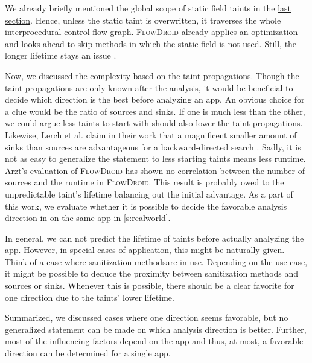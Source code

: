 \documentclass[../draft.tex]{subfiles}
\begin{document}
    We already briefly mentioned the global scope of static field taints in the \hyperref[s:rules]{last section}. Hence, unless the static taint is overwritten, it traverses the whole interprocedural control-flow graph. \textsc{FlowDroid} already applies an optimization and looks ahead to skip methods in which the static field is not used. Still, the longer lifetime stays an issue \cite{Arzt2017PhD}.

    Now, we discussed the complexity based on the taint propagations. Though the taint propagations are only known after the analysis, it would be beneficial to decide which direction is the best before analyzing an app. An obvious choice for a clue would be the ratio of sources and sinks. If one is much less than the other, we could argue less taints to start with should also lower the taint propagations. 
    Likewise, Lerch et al. claim in their work that a magnificent smaller amount of sinks than sources are advantageous for a backward-directed search \cite{Lerch2014}. 
    Sadly, it is not as easy to generalize the statement to less starting taints means less runtime. Arzt's evaluation of \textsc{FlowDroid} has shown no correlation between the number of sources and the runtime in \textsc{FlowDroid}\cite{Arzt2017PhD}. This result is probably owed to the unpredictable taint's lifetime balancing out the initial advantage.
    As a part of this work, we evaluate whether it is possible to decide the favorable analysis direction in  on the same app in \autoref{s:realworld}.

    In general, we can not predict the lifetime of taints before actually analyzing the app. 
    However, in special cases of application, this might be naturally given. 
    Think of a case where sanitization methods\footnotemark are in use. 
    Depending on the use case, it might be possible to deduce the proximity between sanitization methods and sources or sinks.
    Whenever this is possible, there should be a clear favorite for one direction due to the taints' lower lifetime.

    Summarized, we discussed cases where one direction seems favorable, but no generalized statement can be made on which analysis direction is better. Further, most of the influencing factors depend on the app and thus, at most, a favorable direction can be determined for a single app.
\end{document}
